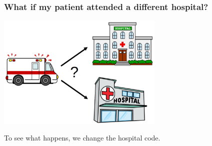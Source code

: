\begin{frame}
\frametitle{What if my patient attended a different hospital?}
\begin{center}
\includegraphics[width=0.60\textwidth]{./images/two_hopsitals}
\end{center}


To see what happens, we change the hospital code. \\


\end{frame}